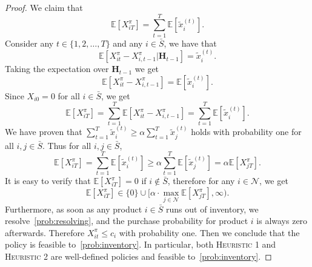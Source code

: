 \documentclass[mnsc,non-blindrev]{informs3}
\theoremstyle{definition}
\begin{document}
\begin{appendices}{\Large{}}
\begin{proof}
We claim that
\begin{equation*}
\mathbb{E}[X_{iT}^\pi]=\sum_{t=1}^T\mathbb{E}[\tilde{x}_i^{(t)}].
\end{equation*}
Consider any $t\in\{1,2,\dots,T\}$ and any $i\in\bar{S}$, we have that
\begin{equation*}
\mathbb{E}[X_{it}^\pi-X_{i,t-1}^\pi|\bm{H}_{t-1}]=\tilde{x}_i^{(t)}.
\end{equation*}
Taking the expectation over $\bm{H}_{t-1}$ we get
\begin{equation*}
\mathbb{E}[X_{it}^\pi-X_{i,t-1}^\pi]=\mathbb{E}[\tilde{x}_i^{(t)}].
\end{equation*}
Since $X_{i0}=0$ for all $i\in\bar{S}$, we get
\begin{equation*}
\mathbb{E}[X_{iT}^\pi]=\sum_{t=1}^T\mathbb{E}[X^\pi_{it}-X^\pi_{i,t-1}]=\sum_{t=1}^T\mathbb{E}[\tilde{x}_i^{(t)}].
\end{equation*}
We have proven that $\sum_{t=1}^T\tilde{x}_i^{(t)}\geq \alpha\sum_{t=1}^T\tilde{x}_j^{(t)}$ holds with probability one for all $i,j\in\bar{S}$. Thus for all $i,j\in\bar{S}$,
$$\mathbb{E}[X_{iT}^\pi]=\sum_{t=1}^T\mathbb{E}[\tilde{x}_i^{(t)}]\geq\alpha\sum_{t=1}^T\mathbb{E}[\tilde{x}_j^{(t)}]=\alpha\mathbb{E}[X_{jT}^\pi].$$
It is easy to verify that $\mathbb{E}[X_{iT}^\pi]=0$ if $i\notin\bar{S}$, therefore for any $i\in\mathcal{N}$, we get
\begin{equation*}
\mathbb{E}[X_{iT}^\pi]\in\{0\}\cup\Big[\alpha\cdot\max_{j\in\mathcal{N}}\mathbb{E}[X_{jT}^\pi],\infty\Big).
\end{equation*}
Furthermore, as soon as any product $i\in\bar{S}$ runs out of inventory, we resolve~\ref{prob:resolving}, and the purchase probability for product $i$ is always zero afterwards. Therefore $X_{it}^\pi\leq c_i$ with probability one. Then we conclude that the policy is feasible to~\ref{prob:inventory}. In particular, both \textsc{Heuristic 1} and \textsc{Heuristic 2} are well-defined policies and feasible to~\ref{prob:inventory}.
\end{proof}




\end{appendices}
\end{document}
